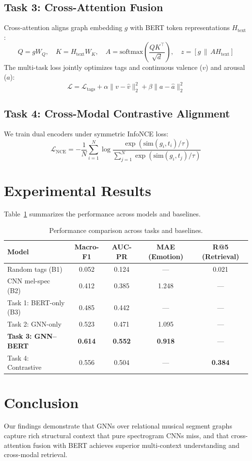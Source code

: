 \documentclass{article}
\begin{document}
\subsection{Task 3: Cross-Attention Fusion}
Cross-attention aligns graph embedding $g$ with BERT token representations $H_{\text{text}}$:
\begin{equation}
Q = g W_Q, \quad K = H_{\text{text}} W_K, \quad A = \text{softmax}\left(\frac{Q K^\top}{\sqrt{d}}\right), \quad z = [g \,\|\, A H_{\text{text}}]
\end{equation}
The multi-task loss jointly optimizes tags and continuous valence ($v$) and arousal ($a$):
\begin{equation}
\mathcal{L} = \mathcal{L}_{\text{tags}} + \alpha \|v - \hat{v}\|_2^2 + \beta \|a - \hat{a}\|_2^2
\end{equation}

\subsection{Task 4: Cross-Modal Contrastive Alignment}
We train dual encoders under symmetric InfoNCE loss:
\begin{equation}
\mathcal{L}_{\text{NCE}} = -\frac{1}{N}\sum_{i=1}^N \log \frac{\exp(\text{sim}(g_i, t_i)/\tau)}{\sum_{j=1}^N \exp(\text{sim}(g_i, t_j)/\tau)}
\end{equation}

\section{Experimental Results}
Table~\ref{tab:results} summarizes the performance across models and baselines.

\begin{table}[h]
\centering
\caption{Performance comparison across tasks and baselines.}
\label{tab:results}
\begin{tabular}{lcccc}
\toprule
\textbf{Model} & \textbf{Macro-F1} & \textbf{AUC-PR} & \textbf{MAE (Emotion)} & \textbf{R@5 (Retrieval)} \\
\midrule
Random tags (B1) & 0.052 & 0.124 & --- & 0.021 \\
CNN mel-spec (B2) & 0.412 & 0.385 & 1.248 & --- \\
Task 1: BERT-only (B3) & 0.485 & 0.442 & --- & --- \\
Task 2: GNN-only & 0.523 & 0.471 & 1.095 & --- \\
\textbf{Task 3: GNN--BERT} & \textbf{0.614} & \textbf{0.552} & \textbf{0.918} & --- \\
Task 4: Contrastive & 0.556 & 0.504 & --- & \textbf{0.384} \\
\bottomrule
\end{tabular}
\end{table}

\section{Conclusion}
Our findings demonstrate that GNNs over relational musical segment graphs capture rich structural context that pure spectrogram CNNs miss, and that cross-attention fusion with BERT achieves superior multi-context understanding and cross-modal retrieval.
\end{document}
